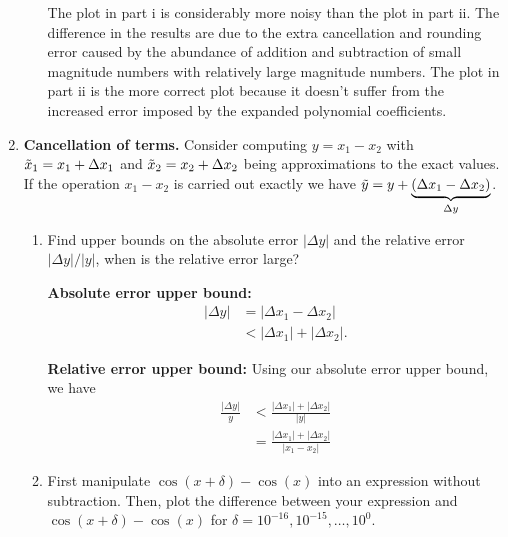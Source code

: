 \documentclass[a4paper,10pt]{article}
\newcommand{\abs}[1]{\left| #1 \right|}
\begin{document}
\begin{enumerate}[label = \arabic*.)]
\begin{enumerate}[label = \roman*.]
            The plot in part i is considerably more noisy than the plot in part ii. The difference in the results are due to the extra cancellation and rounding error caused by the abundance of addition and subtraction of small magnitude numbers with relatively large magnitude numbers. The plot in part ii is the more correct plot because it doesn't suffer from the increased error imposed by the expanded polynomial coefficients. 
        \end{enumerate}
        
        \newpage
        \item \textbf{Cancellation of terms.} Consider computing $y = x_1 - x_2$ with $\Tilde{x}_1 = x_1 + \Delta x_1$ and $\Tilde{x}_2 = x_2 + \Delta x_2$ being approximations to the exact values. If the operation $x_1 - x_2$ is carried out exactly we have $\Tilde{y} = y + \underbrace{(\Delta x_1 - \Delta x_2)}_{\Delta y}$.
        
            \begin{enumerate}[label = \roman*.]
                \item Find upper bounds on the absolute error $\abs{\Delta y}$ and the relative error $\abs{\Delta y} / \abs{y}$, when is the relative error large?
                
                \textbf{Absolute error upper bound:}
                \begin{align*}
                    \abs{\Delta y} &= \abs{\Delta x_1 - \Delta x_2} \\
                    &< \abs{\Delta x_1} + \abs{\Delta x_2}.
                \end{align*}
                
                \textbf{Relative error upper bound:} Using our absolute error upper bound, we have
                \begin{align*}
                    \frac{\abs{\Delta y}}{y} &< \frac{\abs{\Delta x_1} + \abs{\Delta x_2}}{\abs{y}} \\
                    &= \frac{\abs{\Delta x_1} + \abs{\Delta x_2}}{\abs{x_1 - x_2}}
                \end{align*}
                
                \item First manipulate $\cos(x + \delta) - \cos(x)$ into an expression without subtraction. Then, plot the difference between your expression and $\cos(x + \delta) - \cos(x)$ for $\delta = 10^{-16}, 10^{-15}, \ldots, 10^{0}$.
                

\end{enumerate}
\end{enumerate}
\end{document}
